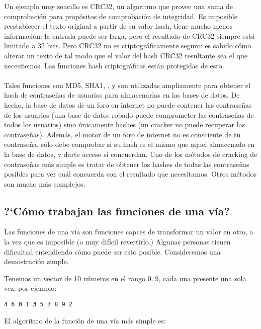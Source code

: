 \myindex{\HashFuncChapterName}
Un ejemplo muy sencillo es CRC32, un algoritmo que provee una  suma de
comprobaci\'on para prop\'ositos de comprobaci\'on de integridad.
Es imposible reestablecer el texto original a partir de su valor hash, tiene mucho menos informaci\'on:
la entrada puede ser larga, pero el resultado de CRC32 siempre est\'a limitado a 32 bits.
Pero CRC32 no es criptogr\'aficamente seguro: es sabido c\'omo alterar un texto de tal modo que el valor
del hash CRC32 resultante sea el que necesitemos.
Las funciones hash criptogr\'aficas est\'an protegidas de esto. \\
\\
Tales funciones son MD5, SHA1, \etc{}, y son utilizadas ampliamente para obtener el hash de contrase\~nas de usuarios para
almacenarlas en las bases de datos.
De hecho, la base de datos de un foro en internet no puede contener las contrase\~nas de los usuarios
(una base de datos robado puede comprometer las contrase\~nas de todos los usuarios) sino \'unicamente
hashes (un cracker no puede recuperar las contrase\~nas).
Adem\'as, el motor de un foro de internet no es consciente de tu contrase\~na, s\'olo debe comprobar
si su hash es el mismo que aquel almacenado en la base de datos, y darte acceso si concuerdan.
Uno de los m\'etodos de cracking de contrase\~nas m\'as simple es tratar de obtener los hashes de todas
las contrase\~nas posibles para ver cu\'al concuerda con el resultado que necesitamos.
Otros m\'etodos son mucho m\'as complejos.

\subsection{?`C\'omo trabajan las funciones de una v\'ia?}

Las funciones de una v\'ia son funciones capces de transformar un valor en otro,
a la vez que es imposible (o muy dif\'icil revertirlo.)
Algunas personas tienen dificultad entendiendo c\'omo puede ser esto posible.
Consideremos una demostraci\'on simple.

Tenemos un vector de 10 n\'umeros en el rango 0..9, cada una presente una sola vez, por ejemplo:

\begin{lstlisting}
4 6 0 1 3 5 7 8 9 2
\end{lstlisting}

El algoritmo de la funci\'on de una v\'ia m\'as simple es:


